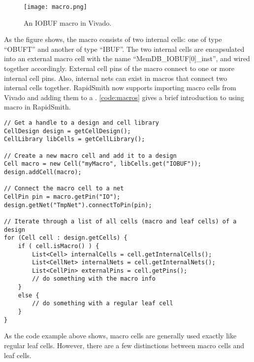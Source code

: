 \begin{figure}[H]
 \centering
 \texttt{[image: macro.png]}
 \caption{An IOBUF macro in Vivado.}
 \label{fig:macros}
\end{figure}

\noindent 
As the figure shows, the macro consists of two internal cells: one of type
``OBUFT'' and another of type ``IBUF''. The two internal cells are encapsulated
into an external macro cell with the name ``MemDB\_IOBUF[0]\_inst'', and wired
together accordingly. External cell pins of the macro connect to one or more
internal cell pins. Also, internal nets can exist in macros that connect two
internal cells together. RapidSmith now supports importing macro cells from
Vivado and adding them to a . \autoref{code:macros} gives a
brief introduction to using macro in RapidSmith.

\begin{lstlisting}[caption=How to use macros in RapidSmith,
label=code:macros] 
// Get a handle to a design and cell library
CellDesign design = getCellDesign();
CellLibrary libCells = getCellLibrary();

// Create a new macro cell and add it to a design
Cell macro = new Cell("myMacro", libCells.get("IOBUF"));
design.addCell(macro);

// Connect the macro cell to a net 
CellPin pin = macro.getPin("IO");
design.getNet("TmpNet").connectToPin(pin);

// Iterate through a list of all cells (macro and leaf cells) of a design
for (Cell cell : design.getCells) {
	if ( cell.isMacro() ) {
		List<Cell> internalCells = cell.getInternalCells();
		List<CellNet> internalNets = cell.getInternalNets();
		List<CellPin> externalPins = cell.getPins();
		// do something with the macro info
	}
	else {
		// do something with a regular leaf cell 
	}
}

\end{lstlisting}

\noindent
As the code example above shows, macro cells are generally used
exactly like regular leaf cells. However, there are a few distinctions
between macro cells and leaf cells.

